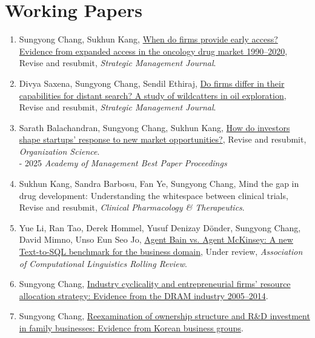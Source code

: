 \documentclass[11pt]{article}
\newenvironment{pubs}
  {\begin{enumerate}[label={(\arabic*)},leftmargin=1.9em,labelsep=0.5em,
     align=left,itemsep=5pt,topsep=3pt]}
  {\end{enumerate}}
\begin{document}
\section{Working Papers}
\begin{pubs}
\item Sungyong Chang, Sukhun Kang, \href{https://papers.ssrn.com/sol3/papers.cfm?abstract_id=4885005}{When do firms provide early access? Evidence from expanded access in the oncology drug market 1990--2020}, Revise and resubmit, \textit{Strategic Management Journal}.
\item Divya Saxena, Sungyong Chang, Sendil Ethiraj, \href{https://sungyongchang.com/2024/07/03/does-the-motivation-for-distant-search-stem-from-capabilities-or-incentives-evidence-from-the-wildcatters-in-the-petroleum-industry/}{Do firms differ in their capabilities for distant search? A study of wildcatters in oil exploration}, Revise and resubmit, \textit{Strategic Management Journal}.
\item Sarath Balachandran, Sungyong Chang, Sukhun Kang, \href{https://papers.ssrn.com/sol3/papers.cfm?abstract_id=4993926}{How do investors shape startups' response to new market opportunities?}, Revise and resubmit, \textit{Organization Science}.\\
{\color{softgray}\footnotesize - 2025 \textit{Academy of Management Best Paper Proceedings}}
\item Sukhun Kang, Sandra Barbosu, Fan Ye, Sungyong Chang, Mind the gap in drug development: Understanding the whitespace between clinical trials, Revise and resubmit, \textit{Clinical Pharmacology \& Therapeutics}.
\item Yue Li, Ran Tao, Derek Hommel, Yusuf Denizay D\"onder, Sungyong Chang, David Mimno, Unso Eun Seo Jo, \href{https://arxiv.org/abs/2510.07309}{Agent Bain vs. Agent McKinsey: A new Text-to-SQL benchmark for the business domain}, Under review, \textit{Association of Computational Linguistics Rolling Review}.
\item Sungyong Chang, \href{https://wordpress.com/post/sungyongchang.com/462}{Industry cyclicality and entrepreneurial firms' resource allocation strategy: Evidence from the DRAM industry 2005--2014}.
\item Sungyong Chang, \href{https://wordpress.com/post/sungyongchang.com/721}{Reexamination of ownership structure and R\&D investment in family businesses: Evidence from Korean business groups}.
\end{pubs}
\end{document}
